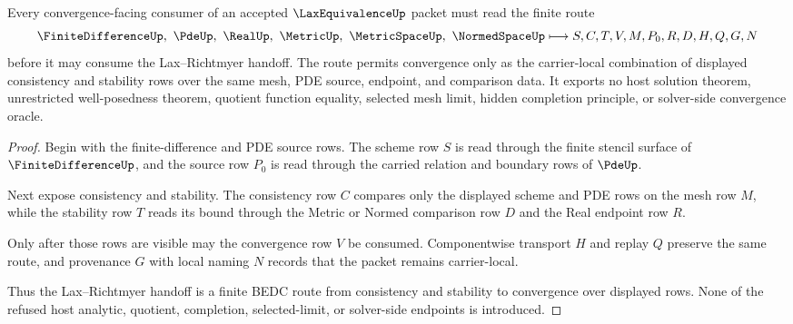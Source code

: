 \begin{theorem}
\label{thm:lax-equivalence-finite-difference-route}
Every convergence-facing consumer of an accepted $\LaxEquivalenceUp$ packet must read the finite route
$$
\FiniteDifferenceUp,\ \PdeUp,\ \RealUp,\ \MetricUp,\ \MetricSpaceUp,\ \NormedSpaceUp
\longmapsto
S,C,T,V,M,P_0,R,D,H,Q,G,N
$$
before it may consume the Lax--Richtmyer handoff. The route permits convergence only as the carrier-local combination of displayed consistency and stability rows over the same mesh, PDE source, endpoint, and comparison data. It exports no host solution theorem, unrestricted well-posedness theorem, quotient function equality, selected mesh limit, hidden completion principle, or solver-side convergence oracle.
\end{theorem}
\begin{proof}
Begin with the finite-difference and PDE source rows. The scheme row $S$ is read through the finite stencil surface of $\FiniteDifferenceUp$, and the source row $P_0$ is read through the carried relation and boundary rows of $\PdeUp$.

Next expose consistency and stability. The consistency row $C$ compares only the displayed scheme and PDE rows on the mesh row $M$, while the stability row $T$ reads its bound through the Metric or Normed comparison row $D$ and the Real endpoint row $R$.

Only after those rows are visible may the convergence row $V$ be consumed. Componentwise transport $H$ and replay $Q$ preserve the same route, and provenance $G$ with local naming $N$ records that the packet remains carrier-local.

Thus the Lax--Richtmyer handoff is a finite BEDC route from consistency and stability to convergence over displayed rows. None of the refused host analytic, quotient, completion, selected-limit, or solver-side endpoints is introduced.
\end{proof}



